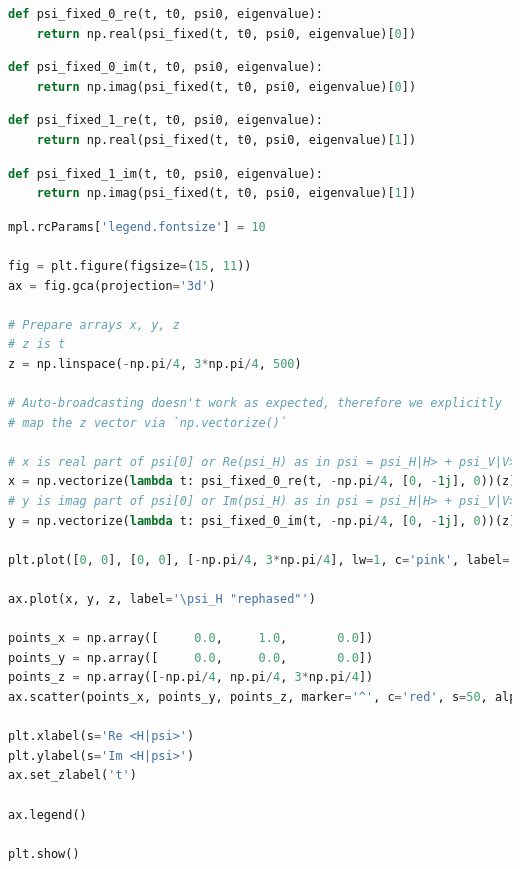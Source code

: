 \begin{lstlisting}[language=Python]
def psi_fixed_0_re(t, t0, psi0, eigenvalue):
    return np.real(psi_fixed(t, t0, psi0, eigenvalue)[0])
\end{lstlisting}

\begin{lstlisting}[language=Python]
def psi_fixed_0_im(t, t0, psi0, eigenvalue):
    return np.imag(psi_fixed(t, t0, psi0, eigenvalue)[0])
\end{lstlisting}

\begin{lstlisting}[language=Python]
def psi_fixed_1_re(t, t0, psi0, eigenvalue):
    return np.real(psi_fixed(t, t0, psi0, eigenvalue)[1])
\end{lstlisting}

\begin{lstlisting}[language=Python]
def psi_fixed_1_im(t, t0, psi0, eigenvalue):
    return np.imag(psi_fixed(t, t0, psi0, eigenvalue)[1])
\end{lstlisting}

\begin{lstlisting}[language=Python]
mpl.rcParams['legend.fontsize'] = 10

fig = plt.figure(figsize=(15, 11))
ax = fig.gca(projection='3d')

# Prepare arrays x, y, z
# z is t
z = np.linspace(-np.pi/4, 3*np.pi/4, 500)

# Auto-broadcasting doesn't work as expected, therefore we explicitly
# map the z vector via `np.vectorize()`

# x is real part of psi[0] or Re(psi_H) as in psi = psi_H|H> + psi_V|V>
x = np.vectorize(lambda t: psi_fixed_0_re(t, -np.pi/4, [0, -1j], 0))(z)
# y is imag part of psi[0] or Im(psi_H) as in psi = psi_H|H> + psi_V|V>
y = np.vectorize(lambda t: psi_fixed_0_im(t, -np.pi/4, [0, -1j], 0))(z)

plt.plot([0, 0], [0, 0], [-np.pi/4, 3*np.pi/4], lw=1, c='pink', label='Time (clock cycle)')

ax.plot(x, y, z, label='\psi_H "rephased"')

points_x = np.array([     0.0,     1.0,       0.0])
points_y = np.array([     0.0,     0.0,       0.0])
points_z = np.array([-np.pi/4, np.pi/4, 3*np.pi/4])
ax.scatter(points_x, points_y, points_z, marker='^', c='red', s=50, alpha=1.0, label='discrete PW')

plt.xlabel(s='Re <H|psi>')
plt.ylabel(s='Im <H|psi>')
ax.set_zlabel('t')

ax.legend()

plt.show()
\end{lstlisting}

